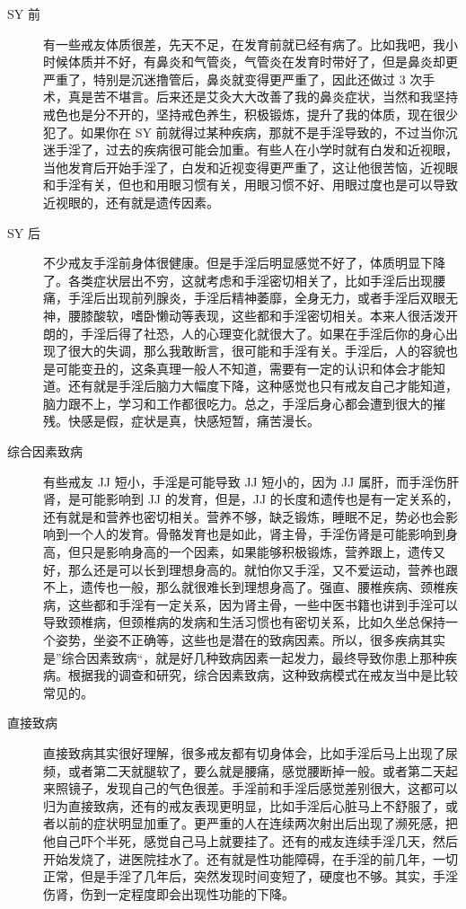 \documentclass{ctexart}
\begin{document}
\begin{description}
    \item[SY 前] 有一些戒友体质很差，先天不足，在发育前就已经有病了。比如我吧，我小时候体质并不好，有鼻炎和气管炎，气管炎在发育时带好了，但是鼻炎却更严重了，特别是沉迷撸管后，鼻炎就变得更严重了，因此还做过 3 次手术，真是苦不堪言。后来还是艾灸大大改善了我的鼻炎症状，当然和我坚持戒色也是分不开的，坚持戒色养生，积极锻炼，提升了我的体质，现在很少犯了。如果你在 SY 前就得过某种疾病，那就不是手淫导致的，不过当你沉迷手淫了，过去的疾病很可能会加重。有些人在小学时就有白发和近视眼，当他发育后开始手淫了，白发和近视变得更严重了，这让他很苦恼，近视眼和手淫有关，但也和用眼习惯有关，用眼习惯不好、用眼过度也是可以导致近视眼的，还有就是遗传因素。
    \item[SY 后] 不少戒友手淫前身体很健康。但是手淫后明显感觉不好了，体质明显下降了。各类症状层出不穷，这就考虑和手淫密切相关了，比如手淫后出现腰痛，手淫后出现前列腺炎，手淫后精神萎靡，全身无力，或者手淫后双眼无神，腰膝酸软，嗜卧懒动等表现，这些都和手淫密切相关。本来人很活泼开朗的，手淫后得了社恐，人的心理变化就很大了。如果在手淫后你的身心出现了很大的失调，那么我敢断言，很可能和手淫有关。手淫后，人的容貌也是可能变丑的，这条真理一般人不知道，需要有一定的认识和体会才能知道。还有就是手淫后脑力大幅度下降，这种感觉也只有戒友自己才能知道，脑力跟不上，学习和工作都很吃力。总之，手淫后身心都会遭到很大的摧残。快感是假，症状是真，快感短暂，痛苦漫长。
    \item[综合因素致病] 有些戒友 JJ 短小，手淫是可能导致 JJ 短小的，因为 JJ 属肝，而手淫伤肝肾，是可能影响到 JJ 的发育，但是，JJ 的长度和遗传也是有一定关系的，还有就是和营养也密切相关。营养不够，缺乏锻炼，睡眠不足，势必也会影响到一个人的发育。骨骼发育也是如此，肾主骨，手淫伤肾是可能影响到身高，但只是影响身高的一个因素，如果能够积极锻炼，营养跟上，遗传又好，那么还是可以长到理想身高的。就怕你又手淫，又不爱运动，营养也跟不上，遗传也一般，那么就很难长到理想身高了。强直、腰椎疾病、颈椎疾病，这些都和手淫有一定关系，因为肾主骨，一些中医书籍也讲到手淫可以导致颈椎病，但颈椎病的发病和生活习惯也有密切关系，比如久坐总保持一个姿势，坐姿不正确等，这些也是潜在的致病因素。所以，很多疾病其实是”综合因素致病“，就是好几种致病因素一起发力，最终导致你患上那种疾病。根据我的调查和研究，综合因素致病，这种致病模式在戒友当中是比较常见的。
    \item[直接致病] 直接致病其实很好理解，很多戒友都有切身体会，比如手淫后马上出现了尿频，或者第二天就腿软了，要么就是腰痛，感觉腰断掉一般。或者第二天起来照镜子，发现自己的气色很差。手淫前和手淫后感觉差别很大，这都可以归为直接致病，还有的戒友表现更明显，比如手淫后心脏马上不舒服了，或者以前的症状明显加重了。更严重的人在连续两次射出后出现了濒死感，把他自己吓个半死，感觉自己马上就要挂了。还有的戒友连续手淫几天，然后开始发烧了，进医院挂水了。还有就是性功能障碍，在手淫的前几年，一切正常，但是手淫了几年后，突然发现时间变短了，硬度也不够。其实，手淫伤肾，伤到一定程度即会出现性功能的下降。

\end{description}
\end{document}
